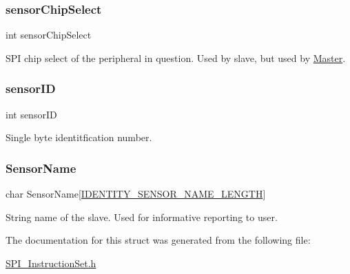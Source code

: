 \subsubsection{\texorpdfstring{sensorChipSelect}{sensorChipSelect}}
{\footnotesize\ttfamily int sensor\+Chip\+Select}



S\+PI chip select of the peripheral in question. Used by slave, but used by \mbox{\hyperlink{class_master}{Master}}. 

\mbox{\label{struct_identity_a4f5a5e2cb7ee061dd0bd29b7086d89ac}} 
\subsubsection{\texorpdfstring{sensorID}{sensorID}}
{\footnotesize\ttfamily int sensor\+ID}



Single byte identitfication number. 

\mbox{\label{struct_identity_adc4d380bde0772c5d53a6383e36178cb}} 
\subsubsection{\texorpdfstring{SensorName}{SensorName}}
{\footnotesize\ttfamily char Sensor\+Name\mbox{[}\mbox{\hyperlink{_s_p_i___instruction_set_8h_addd001d124aca0fe92b3e484732fb7c8}{I\+D\+E\+N\+T\+I\+T\+Y\+\_\+\+S\+E\+N\+S\+O\+R\+\_\+\+N\+A\+M\+E\+\_\+\+L\+E\+N\+G\+TH}}\mbox{]}}



String name of the slave. Used for informative reporting to user. 



The documentation for this struct was generated from the following file\+:\begin{DoxyCompactItemize}
\item 
\mbox{\hyperlink{_s_p_i___instruction_set_8h}{S\+P\+I\+\_\+\+Instruction\+Set.\+h}}\end{DoxyCompactItemize}
